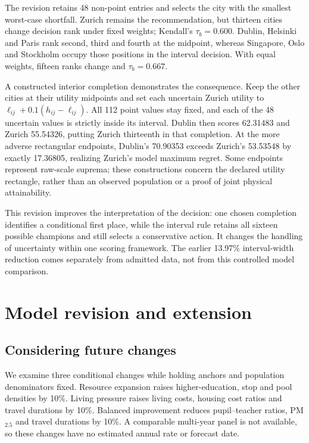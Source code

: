 The revision retains 48 non-point entries and selects the city with the smallest
worst-case shortfall. Zurich remains the recommendation, but thirteen cities
change decision rank under fixed weights; Kendall's $\tau_b=0.600$.
Dublin, Helsinki and Paris rank second, third and fourth at the midpoint,
whereas Singapore, Oslo and Stockholm occupy those positions in the interval
decision. With equal weights, fifteen ranks change and $\tau_b=0.667$.

A constructed interior completion demonstrates the consequence. Keep the other
cities at their utility midpoints and set each uncertain Zurich utility to
$\ell_{ij}+0.1(h_{ij}-\ell_{ij})$. All 112 point values stay fixed, and each
of the 48 uncertain values is strictly inside its interval. Dublin then scores
62.31483 and Zurich 55.54326, putting Zurich thirteenth in that completion.
At the more adverse rectangular endpoints, Dublin's 70.90353 exceeds Zurich's
53.53548 by exactly 17.36805, realizing Zurich's model maximum regret.
Some endpoints represent raw-scale suprema; these constructions concern the
declared utility rectangle, rather than an observed population or a proof of
joint physical attainability.

This revision improves the interpretation of the decision: one chosen completion
identifies a conditional first place, while the interval rule retains all sixteen
possible champions and still selects a conservative action. It changes the
handling of uncertainty within one scoring framework. The earlier 13.97\%
interval-width reduction comes separately from admitted data, not from this
controlled model comparison.

\section{Model revision and extension}
\subsection{Considering future changes}
We examine three conditional changes while holding anchors and population
denominators fixed. Resource expansion raises higher-education, stop and pool
densities by 10\%. Living pressure raises living costs, housing cost ratios and
travel durations by 10\%. Balanced improvement reduces pupil--teacher ratios,
PM$_{2.5}$ and travel durations by 10\%. A comparable multi-year panel is not
available, so these changes have no estimated annual rate or forecast date.


